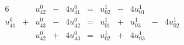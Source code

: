 \begin{alignat}{6}
\label{eq:3.3} && u_{42}^0 & {}-{} &  4u_{41}^0 & {}={} & u_{02}^1 & {}-{} &  4u_{01}^1 && \\
\label{eq:3.4}u_{41}^0 & {}+{} &  u_{43}^0 & {}-{} &  4u_{42}^0 & {}={} & u_{01}^1 & {}+{} &  u_{03}^1 & {}-{} &  4u_{02}^1\\
\label{eq:3.5}&& u_{42}^0 & {}+{} &  4u_{43}^0 & {}={} & u_{02}^1 & {}+{} &  4u_{03}^1 &&
\end{alignat}